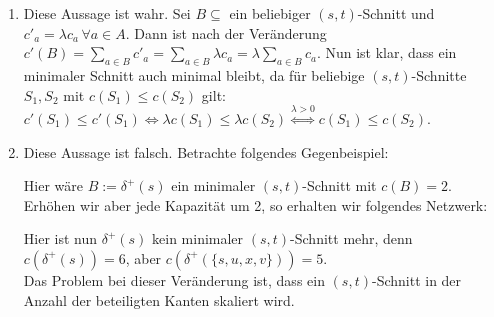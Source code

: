 \documentclass[a4paper,12pt,german]{scrartcl}
\begin{document}
\begin{enumerate}
  \item Diese Aussage ist wahr. Sei $B\subseteq$ ein beliebiger $(s,t)$-Schnitt und $c'_a=\lambda c_a\,\forall a\in A$. Dann ist nach der Veränderung $c'(B)=\sum\limits_{a\in B}c'_a=\sum\limits_{a\in B}\lambda c_a=\lambda\sum\limits_{a\in B}c_a$. Nun ist klar, dass ein minimaler Schnitt auch minimal bleibt, da für beliebige $(s,t)$-Schnitte $S_1,S_2$ mit $c(S_1)\leq c(S_2)$ gilt: $c'(S_1)\leq c'(S_1)\iff \lambda c(S_1)\leq \lambda c(S_2)\stackrel{\lambda>0}{\iff}c(S_1)\leq c(S_2)$.
  \item Diese Aussage ist falsch. Betrachte folgendes Gegenbeispiel:
    \begin{center}
    \end{center}
    Hier wäre $B:=\delta^+(s)$ ein minimaler $(s,t)$-Schnitt mit $c(B)=2$. Erhöhen wir aber jede Kapazität um 2, so erhalten wir folgendes Netzwerk:
        \begin{center}
    \end{center}
    Hier ist nun $\delta^+(s)$ kein minimaler $(s,t)$-Schnitt mehr, denn $c(\delta^+(s))=6$, \linebreak aber $c(\delta^+(\{s,u,x,v\}))=5$.\\
    Das Problem bei dieser Veränderung ist, dass  ein $(s,t)$-Schnitt in der Anzahl der beteiligten Kanten skaliert wird.
  \end{enumerate}  
\end{document}

